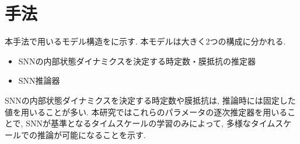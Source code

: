 \section{手法}

本手法で用いるモデル構造をに示す.
本モデルは大きく2つの構成に分かれる.
\begin{itemize}
    \item SNNの内部状態ダイナミクスを決定する時定数・膜抵抗の推定器
    \item SNN推論器
\end{itemize}
SNNの内部状態ダイナミクスを決定する時定数や膜抵抗は, 推論時には固定した値を用いることが多い\cite{ParametricSNN}\cite{zheng2024temporal}.
本研究ではこれらのパラメータの逐次推定器を用いることで, SNNが基準となるタイムスケールの学習のみによって, 多様なタイムスケールでの推論が可能になることを示す.



